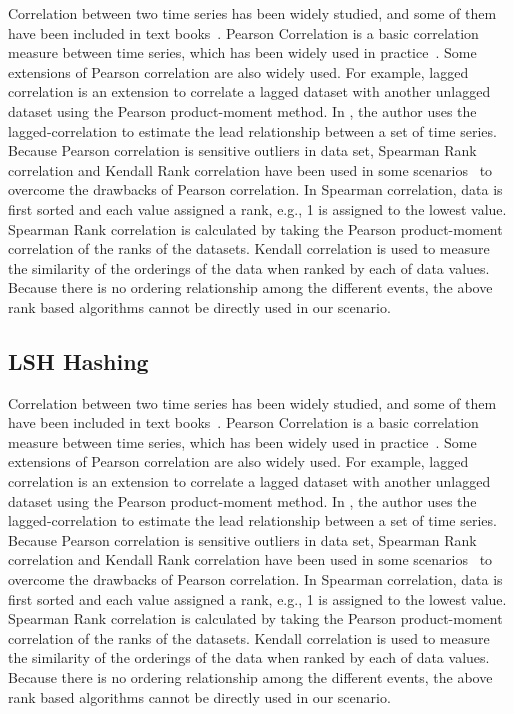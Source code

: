 Correlation between two time series has been widely studied, and some of them have been included in text books~\cite{johnson2002applied}. Pearson Correlation \cite{nagelkerke1991note} is a basic correlation measure between time series, which has been widely used in practice~\cite{Zhu:VLDB:2002}. Some extensions of Pearson correlation are also widely used. For example, lagged correlation is an extension to correlate a lagged dataset with another unlagged dataset using the Pearson product-moment method. In \cite{wu2010detecting}, the author uses the lagged-correlation to estimate the lead relationship between a set of time series. Because Pearson correlation is sensitive outliers in data set, Spearman Rank correlation and Kendall Rank correlation have been used in some scenarios~\cite{Lehman:SAS:2005} to overcome the drawbacks of Pearson correlation. In Spearman correlation, data is first sorted and each value assigned a rank, e.g., 1 is assigned to the lowest value. Spearman Rank correlation is calculated by taking the Pearson product-moment correlation of the ranks of the datasets. Kendall correlation is used to measure the similarity of the orderings of the data when ranked by each of data values. Because there is no ordering relationship among the different events, the above rank based algorithms cannot be directly used in our scenario.

\subsection{LSH Hashing}

Correlation between two time series has been widely studied, and some of them have been included in text books~\cite{johnson2002applied}. Pearson Correlation \cite{nagelkerke1991note} is a basic correlation measure between time series, which has been widely used in practice~\cite{Zhu:VLDB:2002}. Some extensions of Pearson correlation are also widely used. For example, lagged correlation is an extension to correlate a lagged dataset with another unlagged dataset using the Pearson product-moment method. In \cite{wu2010detecting}, the author uses the lagged-correlation to estimate the lead relationship between a set of time series. Because Pearson correlation is sensitive outliers in data set, Spearman Rank correlation and Kendall Rank correlation have been used in some scenarios~\cite{Lehman:SAS:2005} to overcome the drawbacks of Pearson correlation. In Spearman correlation, data is first sorted and each value assigned a rank, e.g., 1 is assigned to the lowest value. Spearman Rank correlation is calculated by taking the Pearson product-moment correlation of the ranks of the datasets. Kendall correlation is used to measure the similarity of the orderings of the data when ranked by each of data values. Because there is no ordering relationship among the different events, the above rank based algorithms cannot be directly used in our scenario.
